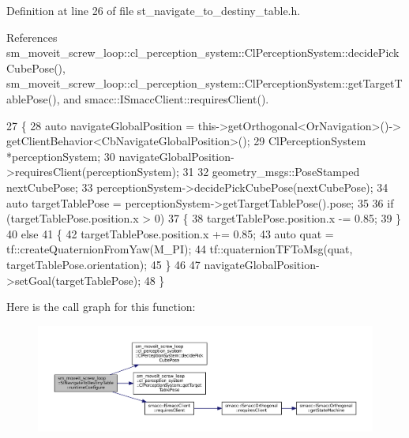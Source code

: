 Definition at line 26 of file st\+\_\+navigate\+\_\+to\+\_\+destiny\+\_\+table.\+h.



References sm\+\_\+moveit\+\_\+screw\+\_\+loop\+::cl\+\_\+perception\+\_\+system\+::\+Cl\+Perception\+System\+::decide\+Pick\+Cube\+Pose(), sm\+\_\+moveit\+\_\+screw\+\_\+loop\+::cl\+\_\+perception\+\_\+system\+::\+Cl\+Perception\+System\+::get\+Target\+Table\+Pose(), and smacc\+::\+I\+Smacc\+Client\+::requires\+Client().


\begin{DoxyCode}
27         \{
28             \textcolor{keyword}{auto} navigateGlobalPosition = this->getOrthogonal<OrNavigation>()->
      getClientBehavior<CbNavigateGlobalPosition>();
29             ClPerceptionSystem *perceptionSystem;
30             navigateGlobalPosition->requiresClient(perceptionSystem);
31 
32             geometry\_msgs::PoseStamped nextCubePose;
33             perceptionSystem->decidePickCubePose(nextCubePose);
34             \textcolor{keyword}{auto} targetTablePose = perceptionSystem->getTargetTablePose().pose;
35 
36             \textcolor{keywordflow}{if} (targetTablePose.position.x > 0)
37             \{
38                 targetTablePose.position.x -= 0.85;   
39             \}
40             \textcolor{keywordflow}{else}
41             \{
42                 targetTablePose.position.x += 0.85;
43                 \textcolor{keyword}{auto} quat = tf::createQuaternionFromYaw(M\_PI);
44                 tf::quaternionTFToMsg(quat, targetTablePose.orientation);
45             \}
46 
47             navigateGlobalPosition->setGoal(targetTablePose);
48         \}
\end{DoxyCode}
Here is the call graph for this function\+:
\nopagebreak
\begin{figure}[H]
\begin{center}
\leavevmode
\includegraphics[width=350pt]{structsm__moveit__screw__loop_1_1StNavigateToDestinyTable_a41b111a7ea65114c449a5d3f0d8e0750_cgraph}
\end{center}
\end{figure}
\mbox{\label{structsm__moveit__screw__loop_1_1StNavigateToDestinyTable_a3c583d0b4b486fa427efb82aa838800c}} 
